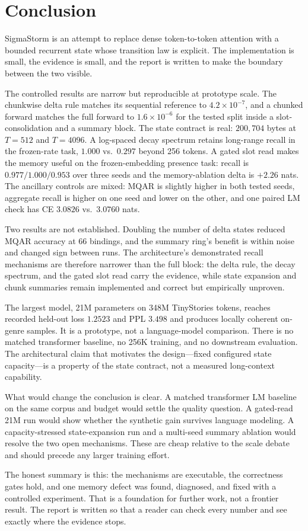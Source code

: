 \section{Conclusion}
\label{sec:conclusion}

SigmaStorm is an attempt to replace dense token-to-token attention with a bounded recurrent
state whose transition law is explicit. The implementation is small, the evidence is small,
and the report is written to make the boundary between the two visible.

The controlled results are narrow but reproducible at prototype scale. The chunkwise delta rule
matches its sequential reference to $4.2\times10^{-7}$, and a chunked forward matches the full
forward to $1.6\times10^{-6}$ for the tested split inside a slot-consolidation and a summary
block. The state contract is real: $200{,}704$ bytes at $T=512$ and $T=4096$. A log-spaced decay
spectrum retains long-range recall in the frozen-rate task, $1.000$ vs.\ $0.297$ beyond 256
tokens. A gated slot read makes the memory useful on the frozen-embedding presence task:
recall is $0.977/1.000/0.953$ over three seeds and the memory-ablation delta is $+2.26$ nats.
The ancillary controls are mixed: MQAR is slightly higher in both tested seeds, aggregate recall
is higher on one seed and lower on the other, and one paired LM check has CE $3.0826$ vs.\
$3.0760$ nats.

Two results are not established. Doubling the number of delta states reduced MQAR accuracy at
66 bindings, and the summary ring's benefit is within noise and changed sign between runs. The
architecture's demonstrated recall mechanisms are therefore narrower than the full block: the
delta rule, the decay spectrum, and the gated slot read carry the evidence, while state
expansion and chunk summaries remain implemented and correct but empirically unproven.

The largest model, 21M parameters on 348M TinyStories tokens, reaches recorded held-out loss
$1.2523$ and PPL $3.498$ and produces locally coherent on-genre samples. It is a prototype,
not a language-model comparison. There is no matched transformer baseline, no 256K training, and
no downstream evaluation. The architectural claim that motivates the design---fixed configured state capacity---is
a property of the state contract, not a measured long-context capability.

What would change the conclusion is clear. A matched transformer LM baseline on the same
corpus and budget would settle the quality question. A gated-read 21M run would show whether
the synthetic gain survives language modeling. A capacity-stressed state-expansion run and a
multi-seed summary ablation would resolve the two open mechanisms. These are cheap relative to
the scale debate and should precede any larger training effort.

The honest summary is this: the mechanisms are executable, the correctness gates hold, and one
memory defect was found, diagnosed, and fixed with a controlled experiment. That is a
foundation for further work, not a frontier result. The report is written so that a reader can
check every number and see exactly where the evidence stops.
